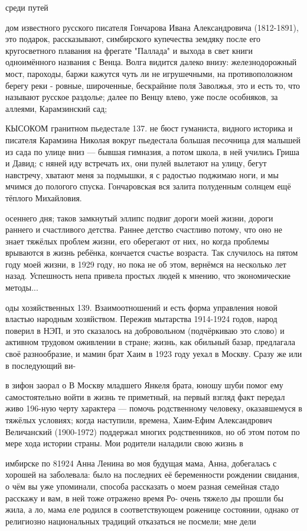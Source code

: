 среди путей

дом известного русского писателя Гончарова Ивана Александровича (1812-1891), это подарок, рассказывают, симбирского купечества земдяку после его кругосветного плавания на фрегате "Паллада" и выхода в свет книги одноимённого названия с Венца. Волга видится далеко внизу: железнодорожный мост, пароходы, баржи кажутся чуть ли не игрушечными, на противоположном берегу реки - ровные, широченные, бескрайние поля Заволжья, это и есть то, что называют русское раздолье; далее по Венцу влево, уже после особняков, за аллеями, Карамзинский сад;

КЫСОКОМ гранитном пьедестале 137. не бюст гуманиста, видного историка и писателя Карамзина Николая вокруг пьедестала большая песочница для малышей из сада по улице вниз — бывшая гимназия, а потом школа, в ней учились Гриша и Давид; с няней иду встречать их, они пулей вылетают на улицу, бегут навстречу, хватают меня за подмышки, я с радостью поджимаю ноги, и мы мчимся до пологого спуска. Гончаровская вся залита полуденным солнцем ещё тёплого Михайловия.

осеннего дня; таков замкнутый эллипс подвиг дороги моей жизни, дороги раннего и счастливого детства. Раннее детство счастливо потому, что оно не знает тяжёлых проблем жизни, его оберегают от них, но когда проблемы врываются в жизнь ребёнка, кончается счастье возраста. Так случилось на пятом году моей жизни, в 1929 году, но пока не об этом, вернёмся на несколько лет назад. Успешность непа привела простых людей к мнению, что экономические методы...

оды хозяйственных 139. Взаимоотношений и есть форма управления новой властью народным хозяйством. Пережив мытарства 1914-1924 годов, народ поверил в НЭП, и это сказалось на добровольном (подчёркиваю это слово) и активном трудовом оживлении в стране; жизнь, как обильный базар, предлагала своё разнообразие, и мамин брат Хаим в 1923 году уехал в Москву. Сразу же или в последующий ви-

в зифон заорал о В Москву младшего Янкеля брата, юношу шуби помог ему самостоятельно войти в жизнь те приметный, на первый взгляд факт передал живо 196-ную черту характера — помочь родственному человеку, оказавшемуся в тяжёлых условиях; когда наступили, времена, Хаим-Ефим Александрович Величанский (1900-1972) поддержал многих родственников, но об этом потом по мере хода истории страны. Мои родители наладили свою жизнь в

имбирске по 81924 Анна Ленина во моя будущая мама, Анна, добегалась с хорошей на заболевала: было на последних её беременности рождении свидания, о чём вы уже упоминали, способа рассказать о моем разная семейная стадо расскажу и вам, в ней тоже отражено время Ро- очень тяжело ды прошли бы жила, а ло, мама еле родился в соответствующем роженице состоянии, однако от религиозно национальных традиций отказаться не посмели; мне дели

